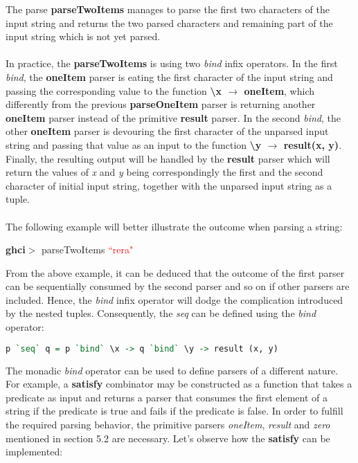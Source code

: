 \documentclass[a4paper, onecolumn]{article}
\begin{document}
    The parse \textbf{parseTwoItems} manages to parse the first two characters of the input string and returns the two parsed characters and remaining part of the input string which is not yet parsed. \\ \\
    In practice, the \textbf{parseTwoItems} is using two \textit{bind} infix operators. In the first \textit{bind}, the \textbf{oneItem} parser is eating the first character of the input string and passing the corresponding value to the function \textbf{\textbackslash x $\rightarrow$ oneItem}, which differently from the previous \textbf{parseOneItem} parser is returning another \textbf{oneItem} parser instead of the primitive \textbf{result} parser. In the second \textit{bind}, the  other \textbf{oneItem} parser is devouring the first character of the unparsed input string and passing that value as an input to the function \textbf{\textbackslash y $\rightarrow$ result(x, y)}. Finally, the resulting output will be handled by the \textbf{result} parser which will return the values of \textit{x} and \textit{y} being correspondingly the first and the second character of initial input string, together with the unparsed input string as a tuple. \\ \\ 
    The following example will better illustrate the outcome when parsing a string:
       \begin{center}
            \textbf{ghci$>$} parseTwoItems \textcolor{red}{``rera"} \\
            [((\textcolor{green}{`r'}, \textcolor{green}{`e'}), \textcolor{red}{``ra"})]
        \end{center}
        
    From the above example, it can be deduced that the outcome of the first parser can be sequentially consumed by the second parser and so on if other parsers are included. Hence, the \textit{bind} infix operator will dodge the complication introduced by the nested tuples. Consequently, the \textit{seq} can be defined using the \textit{bind} operator: 
    
    \begin{tcolorbox}
    \begin{lstlisting}[language=Haskell]
      p `seq` q = p `bind` \x -> q `bind` \y -> result (x, y)
    \end{lstlisting}
    \end{tcolorbox}
    
    The monadic \textit{bind} operator can be used to define parsers of a different nature. For example, a \textbf{satisfy} combinator may be constructed as a function that takes a predicate as input and returns a parser that consumes the first element of a string if the predicate is true and fails if the predicate is false. In order to fulfill the required parsing behavior, the primitive parsers \textit{oneItem}, \textit{result} and \textit{zero} mentioned in section 5.2 are necessary. Let's observe how the \textbf{satisfy} can be implemented: 
    
\end{document}

